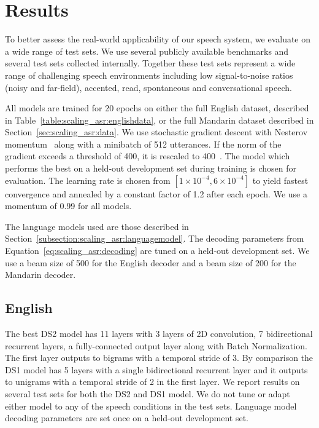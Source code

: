 \section{Results}
\label{sec:scaling_asr:results}

To better assess the real-world applicability of our speech system, we evaluate
on a wide range of test sets. We use several publicly available benchmarks and
several test sets collected internally. Together these test sets represent a
wide range of challenging speech environments including low signal-to-noise
ratios (noisy and far-field), accented, read, spontaneous and conversational
speech. 

All models are trained for 20 epochs on either the full English dataset,
described in Table~\ref{table:scaling_asr:englishdata}, or the full Mandarin
dataset described in Section~\ref{sec:scaling_asr:data}. We use stochastic
gradient descent with Nesterov momentum~\cite{sutskever2013} along with a
minibatch of 512 utterances. If the norm of the gradient exceeds a threshold of
400, it is rescaled to 400~\cite{pascanu2013}. The model which performs the
best on a held-out development set during training is chosen for evaluation.
The learning rate is chosen from $[1\times10^{-4}, 6\times10^{-4}]$ to yield
fastest convergence and annealed by a constant factor of 1.2 after each epoch.
We use a momentum of 0.99 for all models.

The language models used are those described in
Section~\ref{subsection:scaling_asr:languagemodel}. The decoding parameters
from Equation~\ref{eq:scaling_asr:decoding} are tuned on a held-out development
set. We use a beam size of 500 for the English decoder and a beam size of 200
for the Mandarin decoder.

\subsection{English}

The best DS2 model has 11 layers with 3 layers of 2D convolution, 7
bidirectional recurrent layers, a fully-connected output layer along with Batch
Normalization. The first layer outputs to bigrams with a temporal stride of 3.
By comparison the DS1 model has 5 layers with a single bidirectional recurrent
layer and it outputs to unigrams with a temporal stride of 2 in the first
layer. We report results on several test sets for both the DS2 and DS1 model.
We do not tune or adapt either model to any of the speech conditions in the
test sets. Language model decoding parameters are set once on a held-out
development set.

